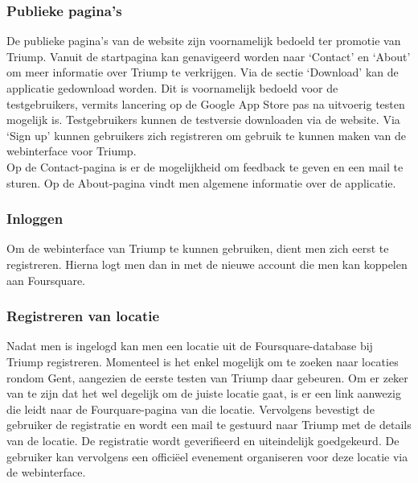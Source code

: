 \subsubsection{Publieke pagina's}
De publieke pagina's van de website zijn voornamelijk bedoeld ter promotie van Triump. Vanuit de startpagina kan genavigeerd worden naar `Contact' en `About' om meer informatie over Triump te verkrijgen. Via de sectie `Download' kan de applicatie gedownload worden. Dit is voornamelijk bedoeld voor de testgebruikers, vermits lancering op de Google App Store pas na uitvoerig testen mogelijk is. Testgebruikers kunnen de testversie downloaden via de website. Via `Sign up' kunnen gebruikers zich registreren om gebruik te kunnen maken van de webinterface voor Triump.\\
Op de Contact-pagina is er de mogelijkheid om feedback te geven en een mail te sturen.
Op de About-pagina vindt men algemene informatie over de applicatie.
\subsubsection{Inloggen}
Om de webinterface van Triump te kunnen gebruiken, dient men zich eerst te registreren. Hierna logt men dan in met de nieuwe account die men kan koppelen aan Foursquare.
\subsubsection{Registreren van locatie}
Nadat men is ingelogd kan men een locatie uit de Foursquare-database bij Triump registreren.
Momenteel is het enkel mogelijk om te zoeken naar locaties rondom Gent, aangezien de eerste testen van Triump daar gebeuren.
Om er zeker van te zijn dat het wel degelijk om de juiste locatie gaat, is er een link aanwezig die leidt naar de Fourquare-pagina van die locatie.
Vervolgens bevestigt de gebruiker de registratie en wordt een mail te gestuurd naar Triump met de details van de locatie. De registratie wordt geverifieerd en uiteindelijk goedgekeurd.
De gebruiker kan vervolgens een officiëel evenement organiseren voor deze locatie via de webinterface.

